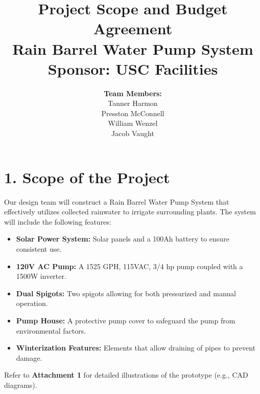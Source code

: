 \documentclass[12pt]{article}
\begin{document}
\title{
    \vspace{2in}
    \textbf{Project Scope and Budget Agreement} \\[1ex]
    \textbf{Rain Barrel Water Pump System} \\[1ex]
    \textbf{Sponsor: USC Facilities} \\[1ex]
    \vspace{2in}
}

\author{
    \textbf{Team Members:} \\[2ex]
    Tanner Harmon \\
    Presston McConnell \\
    William Wenzel \\
    Jacob Vaught \\
}

\date{\vspace{-2em}}

\maketitle
\thispagestyle{fancy}

\newpage

\section*{1. Scope of the Project}
Our design team will construct a Rain Barrel Water Pump System that effectively utilizes collected rainwater to irrigate surrounding plants. The system will include the following features:
\begin{itemize}
    \item \textbf{Solar Power System:} Solar panels and a 100Ah battery to ensure consistent use.
    \item \textbf{120V AC Pump:} A 1525 GPH, 115VAC, 3/4 hp pump coupled with a 1500W inverter.
    \item \textbf{Dual Spigots:} Two spigots allowing for both pressurized and manual operation.
    \item \textbf{Pump House:} A protective pump cover to safeguard the pump from environmental factors.
    \item \textbf{Winterization Features:} Elements that allow draining of pipes to prevent damage.
\end{itemize}
Refer to \textbf{Attachment 1} for detailed illustrations of the prototype (e.g., CAD diagrams).
\end{document}
